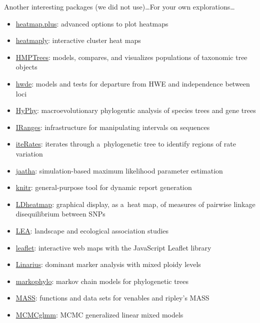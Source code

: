 \documentclass[compress, ucs, xelatex, 11pt, xcolor=svgnames, aspectratio=169,
	hyperref={
		bookmarks=true,
		unicode=true,
		colorlinks=true,
		pdftitle={Molecular data in R},
		plainpages=false,
		pdfauthor={Vojtech Zeisek},
		pdfsubject={Course about phylogeny and evolution in R},
		pdfcreator={XeLaTeX},
		pdfkeywords={R, evolution, phylogeny, molecular data},
		linkcolor=Crimson, %
		anchorcolor=Magenta, %
		citecolor=Magenta, %
		filecolor=Magenta, %
		menucolor=Magenta, %
		urlcolor=DodgerBlue, %
		pdftex},
	url={hyphens, lowtilde} %
	]{beamer}
\begin{document}
\begin{frame}[allowframebreaks]{Another interesting packages (we did not use)\ldots}{For your own explorations\ldots}
\begin{itemize}
		\item \href{https://CRAN.R-project.org/package=heatmap.plus}{heatmap.plus}: advanced options to plot heatmaps
		\item \href{https://CRAN.R-project.org/package=heatmaply}{heatmaply}: interactive cluster heat maps
		\item \href{https://CRAN.R-project.org/package=HMPTrees}{HMPTrees}: models, compares, and visualizes populations of taxonomic tree objects
		\item \href{https://CRAN.R-project.org/package=hwde}{hwde}: models and tests for departure from HWE and independence between loci
		\item \href{https://CRAN.R-project.org/package=HyPhy}{HyPhy}: macroevolutionary phylogentic analysis of species trees and gene trees
		\item \href{https://bioconductor.org/packages/release/bioc/html/IRanges.html}{IRanges}: infrastructure for manipulating intervals on sequences
		\item \href{https://CRAN.R-project.org/package=iteRates}{iteRates}: iterates through a~phylogenetic tree to identify regions of rate variation
		\item \href{https://CRAN.R-project.org/package=jaatha}{jaatha}: simulation-based maximum likelihood parameter estimation
		\item \href{https://CRAN.R-project.org/package=knitr}{knitr}: general-purpose tool for dynamic report generation
		\item \href{https://CRAN.R-project.org/package=LDheatmap}{LDheatmap}: graphical display, as a~heat map, of measures of pairwise linkage disequilibrium between SNPs
		\item \href{https://www.bioconductor.org/packages/release/bioc/html/LEA.html}{LEA}: landscape and ecological association studies
		\item \href{https://CRAN.R-project.org/package=leaflet}{leaflet}: interactive web maps with the JavaScript Leaflet library
		\item \href{https://github.com/giby/Linarius}{Linarius}: dominant marker analysis with mixed ploidy levels
		\item \href{https://CRAN.R-project.org/package=markophylo}{markophylo}: markov chain models for phylogenetic trees
		\item \href{https://CRAN.R-project.org/package=MASS}{MASS}: functions and data sets for venables and ripley's MASS
		\item \href{https://CRAN.R-project.org/package=MCMCglmm}{MCMCglmm}: MCMC generalized linear mixed models

\end{itemize}
\end{frame}
\end{document}
